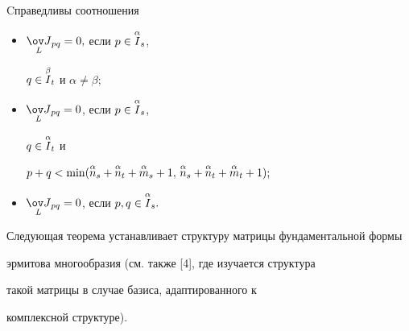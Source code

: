 \begin{lemnonum} Cправедливы соотношения


\begin{itemize}


\item[a)] $\down{L}{\ov J}{}_{pq}=0,$ если $p\in \overset{\alpha}{I}_s$,


$q\in \overset{\beta}{I}_t$ и $\alpha \neq \beta;$


\item[б)] ${\down{L}{\ov J}}{}_{pq}=0$, если $p\in\overset{\alpha}{I}_s$,


$q\in\overset{\alpha}{I}_t$ и


$p+q< \min(\up{\alpha}{n}_s+\up{\alpha}{n}_t+


\up{\alpha}{m}_s+1,\,


\up{\alpha}{n}_s+\up{\alpha}{n}_t+


\up{\alpha}{m}_t+1);$


\item[в)] ${\down{L}{\ov J}}{}_{pq}=0$, если $p,q\in


\up{\alpha}{I}_s.$


\end{itemize}


\end{lemnonum}





Следующая теорема устанавливает структуру матрицы фундаментальной формы


эрмитова многообразия (см. также [4], где изучается структура


такой матрицы в случае базиса, адаптированного к


комплексной структуре).





